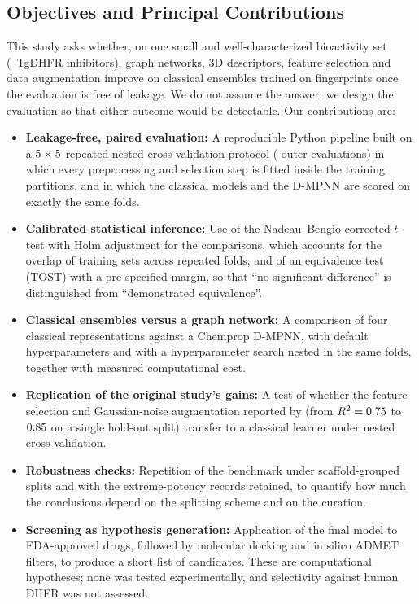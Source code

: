 
\subsection{Objectives and Principal Contributions}

This study asks whether, on one small and well-characterized bioactivity set (\NCompounds\ TgDHFR inhibitors), graph networks, 3D descriptors, feature selection and data augmentation improve on classical ensembles trained on fingerprints once the evaluation is free of leakage. We do not assume the answer; we design the evaluation so that either outcome would be detectable. Our contributions are:

\begin{itemize}
	\item \textbf{Leakage-free, paired evaluation:} A reproducible Python pipeline built on a $5 \times 5$ repeated nested cross-validation protocol (\TotalOuterFolds{} outer evaluations) in which every preprocessing and selection step is fitted inside the training partitions, and in which the classical models and the D-MPNN are scored on exactly the same folds.

	\item \textbf{Calibrated statistical inference:} Use of the Nadeau--Bengio corrected $t$-test with Holm adjustment for the comparisons, which accounts for the overlap of training sets across repeated folds, and of an equivalence test (TOST) with a pre-specified margin, so that ``no significant difference'' is distinguished from ``demonstrated equivalence''.

	\item \textbf{Classical ensembles versus a graph network:} A comparison of four classical representations against a Chemprop D-MPNN, with default hyperparameters and with a hyperparameter search nested in the same folds, together with measured computational cost.

	\item \textbf{Replication of the original study's gains:} A test of whether the feature selection and Gaussian-noise augmentation reported by \cite{karimova2025} (from $R^2 = 0.75{}$ to $0.85{}$ on a single hold-out split) transfer to a classical learner under nested cross-validation.

	\item \textbf{Robustness checks:} Repetition of the benchmark under scaffold-grouped splits and with the extreme-potency records retained, to quantify how much the conclusions depend on the splitting scheme and on the curation.

	\item \textbf{Screening as hypothesis generation:} Application of the final model to FDA-approved drugs, followed by molecular docking and in silico ADMET filters, to produce a short list of candidates. These are computational hypotheses; none was tested experimentally, and selectivity against human DHFR was not assessed.
\end{itemize}
